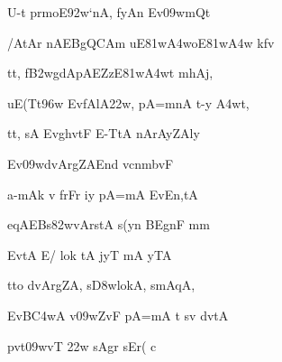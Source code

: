 {\dn U-t\? prmoE\392w`nA, fyAn\2 Ev\309wmQt \vegdn\dontdisplaylinenum}

{\dn /AtAr\2 nAEBgQCAm uE\381w\3A4woE\381w\3A4w k\?fv{\dandabdn} \dontdisplaylinenum}

{\dn tt, f\3B2wgdApAEZzE\381w\3A4wt mhAj, \vegdn\dontdisplaylinenum}

{\dn uE(Tt\396w EvfAlA\322w, pA=mnA t-y \3A4wt,{\dandabdn} \dontdisplaylinenum}

{\dn tt, sA Evg\5hvtF E-TtA nArAyZAly\? \vegdn\dontdisplaylinenum}

{\dn Ev\309wd\?{\qvb}vArgZAEnd\2 vcnmb\5vF \dontdisplaylinenum}

{\dn a-mAk\2 v\4 frFr\? iy\2 pA=mA EvEn,tA \vegdn\dontdisplaylinenum}

{\dn eqAEBs\382wvArstA s(y\?n BEgnF mm{\dandabdn} \dontdisplaylinenum}

{\dn EvtA\2 E/ lok\? tA\2 jyT mA\2 yTA \vegdn\dontdisplaylinenum}

{\dn tto d\?vArgZA, s\3D8wlokA, smAqA,{\dandabdn} \dontdisplaylinenum}

{\dn EvB\3C4wA v\4\309wZvF pA=mA t\? sv\?{\qvb} d\?vtA \vegdn\dontdisplaylinenum}

{\dn pv\0t\?\309wvT \322w\? sAgr\? sEr( c{\dandabdn} \dontdisplaylinenum}

